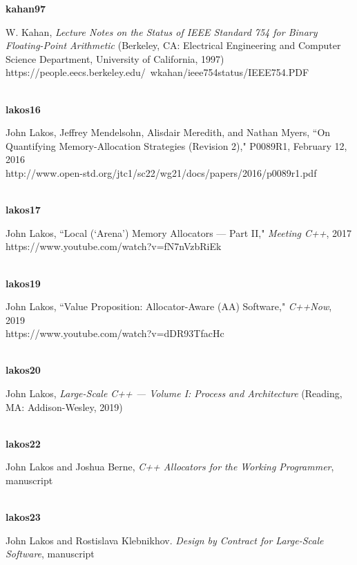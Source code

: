 \noindent\textbf{kahan97}\\
\hspace*{2em}\parbox[t]{\textwidth}{W. Kahan, \textit{Lecture Notes on the Status of IEEE Standard 754 for Binary Floating-Point Arithmetic} (Berkeley, CA: Electrical Engineering and Computer Science Department, University of California, 1997)\\
https://people.eecs.berkeley.edu/~wkahan/ieee754status/IEEE754.PDF }\\

\noindent\textbf{lakos16}\\
\hspace*{2em}\parbox[t]{\textwidth}{John Lakos, Jeffrey Mendelsohn, Alisdair Meredith, and Nathan Myers, ``On Quantifying Memory-Allocation Strategies (Revision 2),"  P0089R1, February 12, 2016\\
http://www.open-std.org/jtc1/sc22/wg21/docs/papers/2016/p0089r1.pdf}\\

\newpage%
\noindent\textbf{lakos17}\\
\hspace*{2em}\parbox[t]{\textwidth}{John Lakos, ``Local (`Arena') Memory Allocators --- Part II," \textit{Meeting C++}, 2017 \\
https://www.youtube.com/watch?v=fN7nVzbRiEk}\\

\noindent\textbf{lakos19}\\
\hspace*{2em}\parbox[t]{\textwidth}{John Lakos, ``Value Proposition: Allocator-Aware (AA) Software," \textit{C++Now}, 2019\\
https://www.youtube.com/watch?v=dDR93TfacHc}\\

\noindent\textbf{lakos20}\\
\hspace*{2em}\parbox[t]{\textwidth}{John Lakos, \textit{Large-Scale C++ --- Volume I: Process and Architecture} (Reading, MA: Addison-Wesley, 2019)}\\

\noindent\textbf{lakos22}\\
\hspace*{2em}\parbox[t]{\textwidth}{John Lakos and Joshua Berne, \textit{C++ Allocators for the Working Programmer}, manuscript} \\

\noindent\textbf{lakos23}\\
\hspace*{2em}\parbox[t]{\textwidth}{John Lakos and Rostislava Klebnikhov. \textit{Design by Contract for Large-Scale Software}, manuscript} \\

